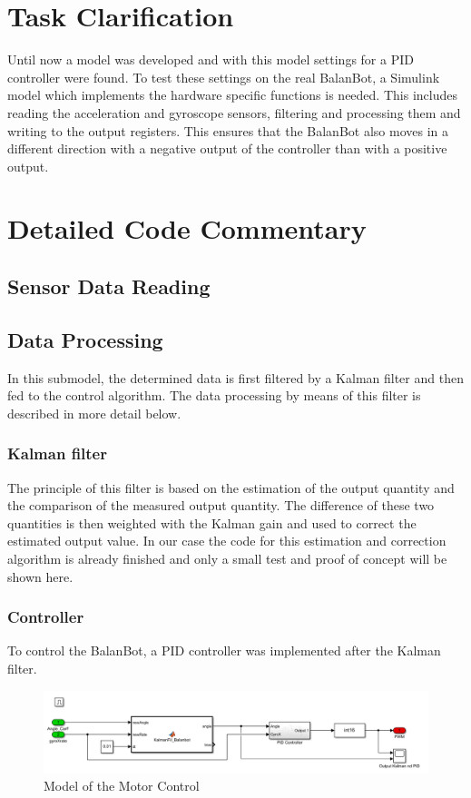 \section{Task Clarification}
Until now a model was developed and with this model settings for a PID controller were found. To test these settings on the real BalanBot, a Simulink model which implements the hardware specific functions is needed. This includes reading the acceleration and gyroscope sensors, filtering and processing them and writing to the output registers. This ensures that the BalanBot also moves in a different direction with a negative output of the controller than with a positive output. 

\section{Detailed Code Commentary}
\subsection{Sensor Data Reading}


\subsection{Data Processing}
In this submodel, the determined data is first filtered by a Kalman filter and then fed to the control algorithm. The data processing by means of this filter is described in more detail below.
\subsubsection{Kalman filter}
The principle of this filter is based on the estimation of the output quantity and the comparison of the measured output quantity. The difference of these two quantities is then weighted with the Kalman gain and used to correct the estimated output value. In our case the code for this estimation and correction algorithm is already finished and only a small test and proof of concept will be shown here. 

\subsubsection{Controller}
To control the BalanBot, a PID controller was implemented after the Kalman filter.
\begin{figure}[H]
    \centering
    \includegraphics[width=\textwidth]{Lab_report/pics/hardware_impl/motor-control.PNG}
    \caption{Model of the Motor Control}
    \label{fig:motor control model}
\end{figure}

